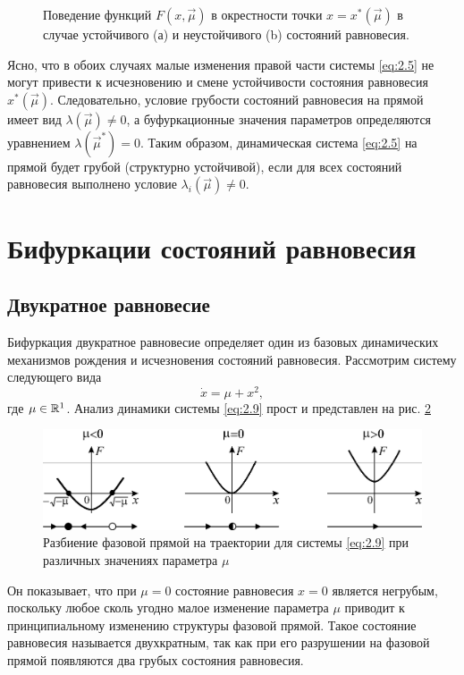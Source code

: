 \begin{figure}[h!]
	\centering
	\begin{minipage}{0.39\linewidth}
		\centering
		\def\svgwidth{\linewidth}
		
		\label{fig:2.3a}
	\end{minipage}
	\hfill{}
	\begin{minipage}{0.39\linewidth}
		\centering
		\def\svgwidth{\linewidth}
		
		\label{fig:2.3b}
	\end{minipage}
	\caption{Поведение функций $F(x, \vec \mu)$ в окрестности точки $x=x^*(\vec \mu)$ в случае устойчивого (а) и неустойчивого (b) состояний равновесия.}
	\label{fig:2.3}
\end{figure}

Ясно, что в обоих случаях малые изменения правой части системы \eqref{eq:2.5} не могут привести к исчезновению и смене устойчивости состояния равновесия $x^*(\vec \mu)$. Следовательно, условие грубости состояний равновесия на прямой имеет вид $\lambda(\vec \mu) \neq 0$, а буфуркационные значения параметров определяются уравнением $\lambda(\vec \mu^*)=0$. Таким образом, динамическая система \eqref{eq:2.5} на прямой будет грубой (структурно устойчивой), если для всех состояний равновесия выполнено условие $\lambda_i (\vec \mu) \neq 0$.

\section{Бифуркации состояний равновесия} %
\subsection{Двукратное равновесие}

Бифуркация двукратное равновесие определяет один из базовых динамических механизмов рождения и исчезновения состояний равновесия. Рассмотрим систему следующего вида
\begin{equation}
	\label{eq:2.9}
	\dot x = \mu  + x^2,	
\end{equation}
где $\mu \in \mathbb{R}^1$. Анализ динамики системы \eqref{eq:2.9} прост и представлен на рис. \ref{fig:2.4}
\begin{figure}[h!]
	\centering
	\includegraphics[width=\linewidth]{fig/lect2/4}
	\caption{Разбиение фазовой прямой на траектории для системы \eqref{eq:2.9} при различных значениях параметра $\mu$}	
	\label{fig:2.4}	
\end{figure}
Он показывает, что при $\mu =0 $ состояние равновесия $x=0$ является негрубым, поскольку любое сколь угодно малое изменение параметра $\mu$ приводит к принципиальному изменению структуры фазовой прямой. Такое состояние равновесия называется двухкратным, так как при его разрушении на фазовой прямой появляются два грубых состояния равновесия. 

